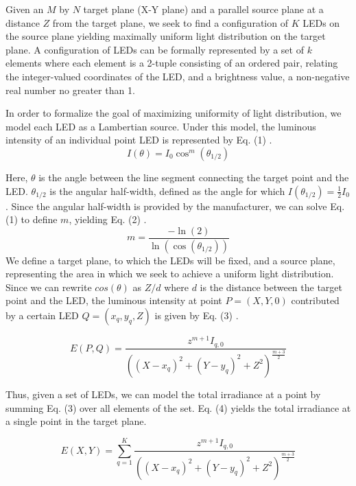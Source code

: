 \documentclass[a4paper]{article}
\begin{document}
Given an $M$ by $N$ target plane (X-Y plane) and a parallel source plane at a distance $Z$ from the target plane, we seek to find a configuration of $K$ LEDs on the source plane yielding maximally uniform light distribution on the target plane. A configuration of LEDs can be formally represented by a set of $k$ elements where each element is a 2-tuple consisting of an ordered pair, relating the integer-valued coordinates of the LED, and a brightness value, a non-negative real number no greater than 1. 

In order to formalize the goal of maximizing uniformity of light distribution, we model each LED as a Lambertian source. Under this model, the luminous intensity of an individual point LED is represented by Eq. (1) \cite{su}.
\begin{equation}
I(\theta) = I_0\cos^m (\theta_{1/2})
\end{equation}

Here, $\theta$ is the angle between the line segment connecting the target point and the LED. $\theta_{1/2}$ is the angular half-width, defined as the angle for which $I(\theta_{1/2}) = \frac{1}{2}I_0$. Since the angular half-width is provided by the manufacturer, we can solve Eq. (1) to define $m$, yielding Eq. (2) \cite{su}.
\begin{equation}
m = \frac{-\ln(2)}{\ln(\cos(\theta_{1/2}))}
\end{equation}
We define a target plane, to which the LEDs will be fixed, and a source plane, representing the area in which we seek to achieve a uniform light distribution. Since we can rewrite $cos(\theta)$ as $Z/d$ where $d$ is the distance between the target point and the LED, the luminous intensity at point $P = (X, Y, 0)$ contributed by a certain LED $Q = (x_q, y_q, Z)$ is given by Eq. (3) \cite{su}.

\begin{equation}
E(P, Q) = \frac{z^{m+1}I_{q,0}}{((X - x_q)^2 + (Y - y_q)^2 + Z^2)^{\frac{m+3}{2}}}
\end{equation}

Thus, given a set of LEDs, we can model the total irradiance at a point by summing Eq. (3) over all elements of the set. Eq. (4) \cite{su} yields the total irradiance at a single point in the target plane. 

\begin{equation}
E(X, Y) = \sum\limits_{q=1}^{K} \frac{z^{m+1}I_{q,0}}{((X - x_q)^2 + (Y - y_q)^2 + Z^2)^{\frac{m+3}{2}}}
\end{equation}
\end{document}
